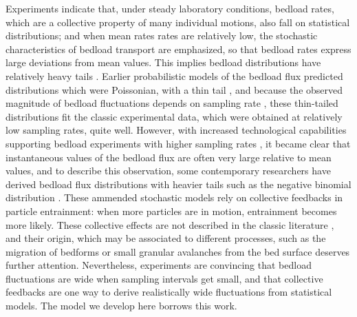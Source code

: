 \documentclass{article}
\begin{document}
Experiments indicate that, under steady laboratory conditions, bedload rates, which are a collective property of many individual motions, also fall on statistical distributions; and when mean rates rates are relatively low, the stochastic characteristics of bedload transport are emphasized, so that bedload rates express large deviations from mean values. This implies bedload distributions have relatively heavy tails \citep{Bohm2004, Ancey2008, Singh2009}. Earlier probabilistic models of the bedload flux predicted distributions which were Poissonian, with a thin tail \citep{Crickmore1962, Sayre1965, Yano1969a}, and because the observed magnitude of bedload fluctuations depends on sampling rate \citep{Ma2014}, these thin-tailed distributions fit the classic experimental data, which were obtained at relatively low sampling rates, quite well. However, with increased technological capabilities supporting bedload experiments with higher sampling rates \citep{Bohm2004, Ancey2008, Singh2009}, it became clear that instantaneous values of the bedload flux are often very large relative to mean values, and to describe this observation, some contemporary researchers have derived bedload flux distributions with heavier tails such as the negative binomial distribution \citep{Ancey2008, Heyman2013, Ma2014}. These ammended stochastic models rely on collective feedbacks in particle entrainment: when more particles are in motion, entrainment becomes more likely. These collective effects are not described in the classic literature \citep{Paintal1971, Shen1980}, and their origin, which may be associated to different processes, such as the migration of bedforms \citep{Dhont2018} or small granular avalanches from the bed surface \citep{Heyman2013} deserves further attention. Nevertheless, experiments are convincing that bedload fluctuations are wide when sampling intervals get small, and that collective feedbacks are one way to derive realistically wide fluctuations from statistical models. The model we develop here borrows this work. 
\end{document}
